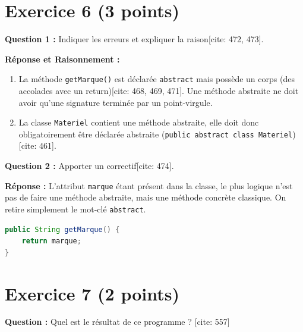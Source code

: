 \documentclass[11pt,a4paper]{article}
\begin{document}
\section*{Exercice 6 (3 points)}
\textbf{Question 1 :} Indiquer les erreurs et expliquer la raison[cite: 472, 473].

\textbf{Réponse et Raisonnement :}
\begin{enumerate}
    \item La méthode \texttt{getMarque()} est déclarée \texttt{abstract} mais possède un corps (des accolades avec un return)[cite: 468, 469, 471]. Une méthode abstraite ne doit avoir qu'une signature terminée par un point-virgule.
    \item La classe \texttt{Materiel} contient une méthode abstraite, elle doit donc obligatoirement être déclarée abstraite (\texttt{public abstract class Materiel})[cite: 461].
\end{enumerate}

\textbf{Question 2 :} Apporter un correctif[cite: 474].

\textbf{Réponse :} L'attribut \texttt{marque} étant présent dans la classe, le plus logique n'est pas de faire une méthode abstraite, mais une méthode concrète classique. On retire simplement le mot-clé \texttt{abstract}.
\begin{lstlisting}[language=Java]
public String getMarque() {
    return marque;
}
\end{lstlisting}

\section*{Exercice 7 (2 points)}
\textbf{Question :} Quel est le résultat de ce programme ? [cite: 557]
\end{document}

